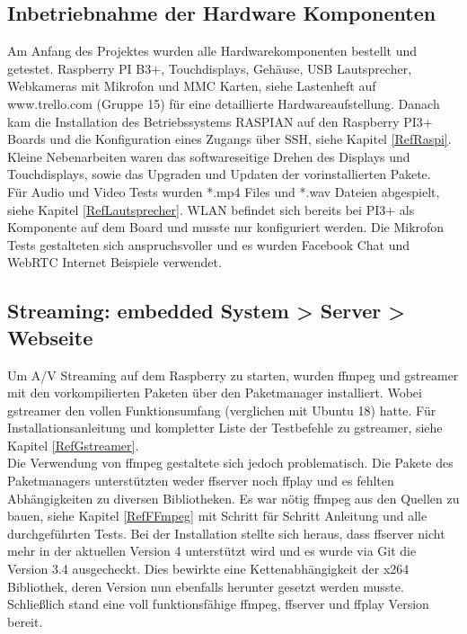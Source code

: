 \subsection{Inbetriebnahme der Hardware Komponenten}
Am Anfang des Projektes wurden alle Hardwarekomponenten bestellt und getestet. Raspberry PI B3+, Touchdisplays, Gehäuse, USB Lautsprecher, Webkameras mit Mikrofon und MMC Karten, siehe Lastenheft auf www.trello.com (Gruppe 15) für eine detaillierte Hardwareaufstellung. Danach kam die Installation des Betriebssystems RASPIAN auf den Raspberry PI3+ Boards und die Konfiguration eines Zugangs über SSH, siehe Kapitel \ref{RefRaspi}. Kleine Nebenarbeiten waren das softwareseitige Drehen des Displays und Touchdisplays, sowie das Upgraden und Updaten der vorinstallierten Pakete.\\
Für Audio und Video Tests wurden *.mp4 Files und *.wav Dateien abgespielt, siehe Kapitel \ref{RefLautsprecher}. WLAN befindet sich bereits bei PI3+ als Komponente auf dem Board und musste nur konfiguriert werden. Die Mikrofon Tests gestalteten sich anspruchsvoller und es wurden Facebook Chat und WebRTC Internet Beispiele verwendet.

\subsection{Streaming: embedded System > Server > Webseite}
Um A/V Streaming auf dem Raspberry zu starten, wurden ffmpeg und gstreamer mit den 
vorkompilierten Paketen über den Paketmanager installiert. Wobei gstreamer den vollen Funktionsumfang (verglichen mit Ubuntu 18) hatte. Für Installationsanleitung und kompletter Liste der Testbefehle zu gstreamer, siehe Kapitel \ref{RefGstreamer}. \\
Die Verwendung von ffmpeg gestaltete sich jedoch problematisch. Die Pakete des Paketmanagers unterstützten weder ffserver noch ffplay und es fehlten Abhängigkeiten zu diversen Bibliotheken. Es war nötig ffmpeg aus den Quellen zu bauen, siehe Kapitel \ref{RefFFmpeg} mit Schritt für Schritt Anleitung und alle durchgeführten Tests. Bei der Installation stellte sich heraus, dass ffserver nicht mehr in der aktuellen Version 4 unterstützt wird und es wurde via Git die Version 3.4 ausgecheckt. Dies bewirkte eine Kettenabhängigkeit der x264 Bibliothek, deren Version nun ebenfalls herunter gesetzt werden musste. Schließlich stand eine voll funktionsfähige ffmpeg, ffserver und ffplay Version bereit.\\ 

